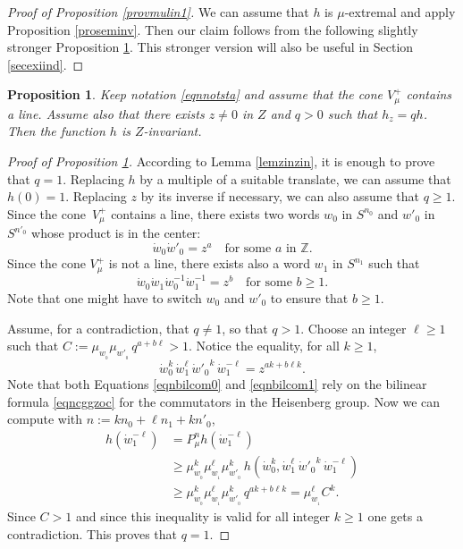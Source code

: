 \documentclass[11pt]{article}
\numberwithin{equation}{section}
\newtheorem{Prop}[Thm]{Proposition}
\theoremstyle{definition}
\newcommand{\m}[1]{\mathbb{ #1}}
\begin{document}
\begin{proof}[Proof of Proposition \ref{provmulin1}]
We can assume that $h$ is $\mu$-extremal
and apply Proposition \ref{proseminv}.
Then our claim follows from the following slightly stronger
Proposition \ref{provmulin2}.
This stronger version will also be useful in Section \ref{secexiind}.
\end{proof}

\begin{Prop}

\label{provmulin2}
Keep notation \eqref{eqnnotsta} and assume that
the cone $V^+_\mu$ contains a line.
Assume also that there exists $z\neq 0$ in $Z$ and $q>0$ such that
$h_z=qh$. Then the function $h$ is $Z$-invariant.
\end{Prop}

\begin{proof}[Proof of Proposition \ref{provmulin2}]
According to Lemma \ref{lemzinzin}, it is enough to prove that $q=1$.
Replacing $h$ by a multiple of a suitable translate, we can assume that $h(0)= 1$.
Replacing $z$ by its inverse if necessary, we can also assume that $q\geq 1$.
Since the cone~$V_\mu^+$ contains a line,
there exists two words
$w_0$ in $S^{n_0}$ and $w'_0$ in $S^{n'_0}$
whose product is in the center:
\[
\dot{w}_0\dot{w}'_0= z^a
\quad\text{for some $a$ in $\m Z$.}
\]
Since the cone $V^+_\mu$ is not a line, there exists also a word $w_1$ in $S^{n_1}$ such that
\begin{equation}
\label{eqnbilcom0}
\dot{w}_0\dot{w}_1\dot{w}^{-1}_0\dot{w}_1^{-1}= z^b
\quad\text{for some $b\geq 1$.}
\end{equation}
Note that one might have to switch $w_0$ and $w'_0$
to ensure that $b\geq 1$.

Assume, for a contradiction, that $q\neq 1$, so that $q>1$. Choose an integer $\ell\geq 1$
such that $C:=\mu_{w_{_0}}\mu_{w'_{_0}}\,q^{a+b\ell}>1$. Notice the equality, for all $k\geq 1$,
\begin{equation}
\label{eqnbilcom1}
\dot{w}_0^k \,\dot{w}_1^\ell\, {\mbox{$\dot{w}$}'_0}^k\, \dot{w}_1^{-\ell} = z^{ak+b\ell k}.
\end{equation}
Note that both Equations \eqref{eqnbilcom0} and \eqref{eqnbilcom1} rely on
the bilinear formula \eqref{eqncggzoc}
for the commutators in the Heisenberg group.
Now we can compute with $n:=kn_0\!+\!\ell n_1\!+\! kn'_0$,
\begin{align*}
\label{eqnhwlcln}
h(\dot{w}_1^{-\ell})&=
P_\mu^{n}h(\dot{w}_1^{-\ell})\\
&\geq
\mu_{w_{_0}}^k \mu_{w_{_1}}^\ell \mu_{w'_{_0}}^k\,
h(\dot{w}_0^k, \dot{w}_1^\ell\, {\mbox{$\dot{w}$}'_0}^k\, \dot{w}_1^{-\ell})\\
&\geq
\mu_{w_{_0}}^k \mu_{w_{_1}}^\ell \mu_{w'_{_0}}^k\, q^{ak+b\ell k}
= \mu_{w_{_1}}^\ell C^k.
\end{align*}
Since $C>1$ and since this inequality is valid for all integer $k\geq 1$
one gets a contradiction. This proves that $q= 1$.
\end{proof}
\end{document}
